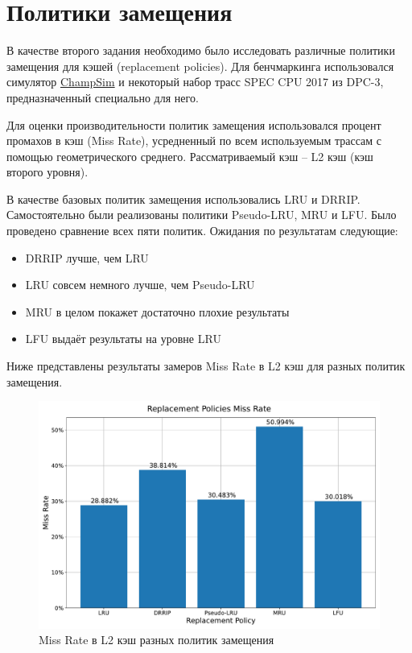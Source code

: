 


	
	
	\section*{Политики замещения}

	В качестве второго задания необходимо было исследовать различные политики замещения для кэшей (replacement policies). Для бенчмаркинга использовался симулятор \href{https://github.com/ChampSim/ChampSim}{ChampSim} и некоторый набор трасс SPEC CPU 2017 из DPC-3, предназначенный специально для него.
	
	Для оценки производительности политик замещения использовался процент промахов в кэш (Miss Rate), усредненный по всем используемым трассам с помощью геометрического среднего. Рассматриваемый кэш -- L2 кэш (кэш второго уровня).
	
	В качестве базовых политик замещения использовались LRU и DRRIP. Самостоятельно были реализованы политики Pseudo-LRU, MRU и LFU. Было проведено сравнение всех пяти политик. Ожидания по результатам следующие:
	\begin{itemize}
		\item DRRIP лучше, чем LRU
		\item LRU совсем немного лучше, чем Pseudo-LRU
		\item MRU в целом покажет достаточно плохие результаты
		\item LFU выдаёт результаты на уровне LRU
	\end{itemize}
	
	Ниже представлены результаты замеров Miss Rate в L2 кэш для разных политик замещения.
	
	\begin{figure}[h!]
		\centering
		\includegraphics[width=\linewidth]{./pictures/miss_rate_gmean.pdf}
		\caption{Miss Rate в L2 кэш разных политик замещения}
	\end{figure}
	

